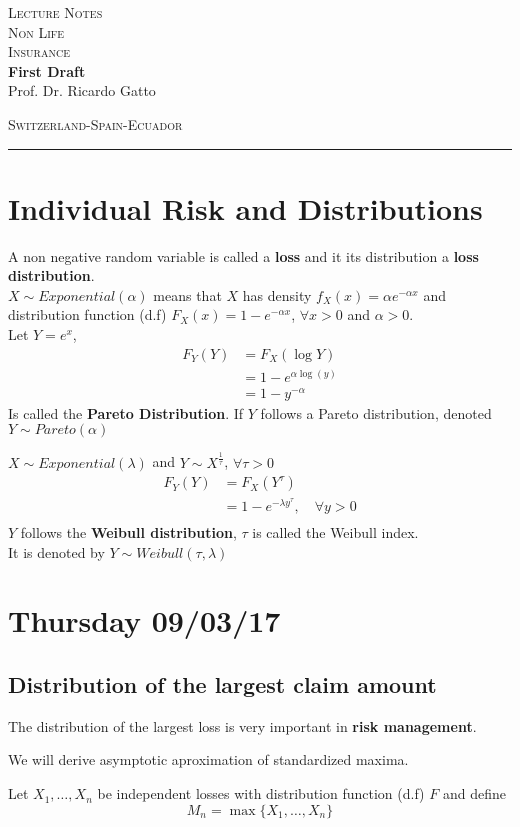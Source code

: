 \documentclass[11pt,a4paper,oneside]{article}
\newcommand*{\titleBOOK}{\begingroup
\centering
\vspace*{\baselineskip}
\vspace*{\baselineskip}
{\Huge\scshape Lecture Notes}\\[10mm]
{\Huge\scshape Non Life  \\[5mm]
Insurance} \\ [\baselineskip]
{\Large\bfseries First Draft}\\[0.3 \textheight]
{\Large Prof. Dr. Ricardo Gatto}\\
\vfill
\begin{center}
{\scshape Switzerland-Spain-Ecuador}\\
\rule{\textwidth}{0.5pt}
\end{center}
\vspace*{\baselineskip}
\endgroup}
\begin{document}

\titleBOOK
\newpage

\tableofcontents
\newpage


\section{Individual Risk and Distributions}
A non negative random variable is called a \textbf{loss} and it its distribution a \textbf{loss distribution}.\\
$X\sim Exponential(\alpha)$ means that $X$ has density $f_X(x)=\alpha e^{-\alpha x}$ and distribution function (d.f) $F_X(x)=1-e^{-\alpha x}$, $\forall x>0$ and $\alpha>0$.\\


Let $Y=e^x$, 
\begin{align*}
F_Y(Y) &= F_X(\log Y)\\
&=1-e^{\alpha \log (y)}\\
&=1-y^{-\alpha}
\end{align*}
Is called the \textbf{Pareto Distribution}. If $Y$ follows a Pareto distribution, denoted  $Y\sim Pareto(\alpha)$


$X\sim Exponential (\lambda)$ and $Y\sim X^{\frac{1}{\tau}}$, $\forall \tau>0$
\begin{align*}
F_Y(Y) &= F_X(Y^{\tau})\\
&=1-e^{-\lambda y^{\tau}}, \quad \forall y>0\\
\end{align*}
$Y$ follows the \textbf{Weibull distribution}, $\tau$ is called the Weibull index.\\ It is denoted by $Y\sim Weibull(\tau,\lambda)$


\section{Thursday 09/03/17}

\subsection{Distribution of the largest claim amount}

The distribution of the largest loss is very important in \textbf{risk management}.

We will derive asymptotic aproximation of standardized maxima.

Let $X_1,\ldots,X_n$ be independent losses with distribution function (d.f) $F$ and define 
\[M_n=\max\{X_1,\ldots,X_n\}\]
\end{document}
